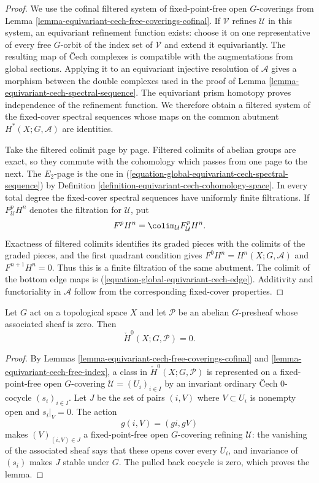 \begin{proof}
We use the cofinal filtered system of fixed-point-free open
$G$-coverings from Lemma
\ref{lemma-equivariant-cech-free-coverings-cofinal}. If
$\mathcal V$ refines $\mathcal U$ in this system, an equivariant
refinement function exists: choose it on one representative of every
free $G$-orbit of the index set of $\mathcal V$ and extend it
equivariantly. The resulting map of \v Cech complexes is compatible with
the augmentations from global sections. Applying it to an equivariant
injective resolution of $\mathcal A$ gives a morphism between the double
complexes used in the proof of Lemma
\ref{lemma-equivariant-cech-spectral-sequence}. The equivariant prism
homotopy proves independence of the refinement function. We therefore
obtain a filtered system of the fixed-cover spectral sequences whose
maps on the common abutment $H^*(X;G,\mathcal A)$ are identities.

Take the filtered colimit page by page. Filtered colimits of abelian
groups are exact, so they commute with the cohomology which passes from
one page to the next. The $E_2$-page is the one in
(\ref{equation-global-equivariant-cech-spectral-sequence}) by Definition
\ref{definition-equivariant-cech-cohomology-space}. In every total degree
the fixed-cover spectral sequences have uniformly finite filtrations. If
$F^p_{\mathcal U}H^n$ denotes the filtration for $\mathcal U$, put
$$
F^pH^n=\colim_{\mathcal U}F^p_{\mathcal U}H^n.
$$
Exactness of filtered colimits identifies its graded pieces with the
colimits of the graded pieces, and the first quadrant condition gives
$F^0H^n=H^n(X;G,\mathcal A)$ and $F^{n+1}H^n=0$. Thus this is a finite
filtration of the same abutment. The
colimit of the bottom edge maps is
(\ref{equation-global-equivariant-cech-edge}). Additivity and
functoriality in $\mathcal A$ follow from the corresponding fixed-cover
properties.
\end{proof}

\begin{lemma}
\label{lemma-equivariant-cech-zero-associated-sheaf-degree-zero}
Let $G$ act on a topological space $X$ and let $\mathcal P$ be an
abelian $G$-presheaf whose associated sheaf is zero. Then
$$
\check H^0(X;G,\mathcal P)=0.
$$
\end{lemma}

\begin{proof}
By Lemmas \ref{lemma-equivariant-cech-free-coverings-cofinal} and
\ref{lemma-equivariant-cech-free-index}, a class in
$\check H^0(X;G,\mathcal P)$ is represented on a fixed-point-free open
$G$-covering $\mathcal U=(U_i)_{i\in I}$ by an invariant ordinary \v Cech
$0$-cocycle $(s_i)_{i\in I}$. Let $J$ be the set of pairs $(i,V)$ where
$V\subset U_i$ is nonempty open and $s_i|_V=0$. The action
$$
g(i,V)=(gi,gV)
$$
makes $(V)_{(i,V)\in J}$ a fixed-point-free open $G$-covering refining
$\mathcal U$: the vanishing of the associated sheaf says that these opens
cover every $U_i$, and invariance of $(s_i)$ makes $J$ stable under $G$.
The pulled back cocycle is zero, which proves the lemma.
\end{proof}


